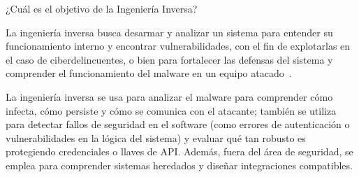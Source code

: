 ¿Cuál es el objetivo de la Ingeniería Inversa?

La ingeniería inversa busca desarmar y analizar un sistema para entender su funcionamiento interno y encontrar vulnerabilidades, con el fin de explotarlas en el caso de ciberdelincuentes, o bien para fortalecer las defensas del sistema y comprender el funcionamiento del malware en un equipo atacado~\cite{II}.

La ingeniería inversa se usa para analizar el malware para comprender cómo infecta, cómo persiste y cómo se comunica con el atacante; también se utiliza para detectar fallos de seguridad en el software (como errores de autenticación o vulnerabilidades en la lógica del sistema) y evaluar qué tan robusto es protegiendo credenciales o llaves de API. Además, fuera del área de seguridad, se emplea para comprender sistemas heredados y diseñar integraciones compatibles.


